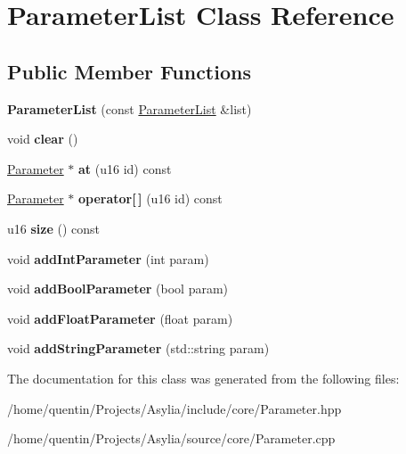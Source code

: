 \hypertarget{classParameterList}{\section{Parameter\-List Class Reference}
\label{classParameterList}
}
\subsection*{Public Member Functions}
\begin{DoxyCompactItemize}
\item 
\hypertarget{classParameterList_acaad445445e1d62203322e3f5c049172}{{\bfseries Parameter\-List} (const \hyperlink{classParameterList}{Parameter\-List} \&list)}\label{classParameterList_acaad445445e1d62203322e3f5c049172}

\item 
\hypertarget{classParameterList_a6f2125f1182f2615d5b4e4ce5351651f}{void {\bfseries clear} ()}\label{classParameterList_a6f2125f1182f2615d5b4e4ce5351651f}

\item 
\hypertarget{classParameterList_a5337ced79cbaf86cda826f99f3c622fa}{\hyperlink{classParameter}{Parameter} $\ast$ {\bfseries at} (u16 id) const }\label{classParameterList_a5337ced79cbaf86cda826f99f3c622fa}

\item 
\hypertarget{classParameterList_af413109556e5e36b89bbd9e63e64fb54}{\hyperlink{classParameter}{Parameter} $\ast$ {\bfseries operator\mbox{[}$\,$\mbox{]}} (u16 id) const }\label{classParameterList_af413109556e5e36b89bbd9e63e64fb54}

\item 
\hypertarget{classParameterList_a398b37da9adf25660d5646cb52fb94e1}{u16 {\bfseries size} () const }\label{classParameterList_a398b37da9adf25660d5646cb52fb94e1}

\item 
\hypertarget{classParameterList_a63f35d0e0e11936de0e13ef3246b1fef}{void {\bfseries add\-Int\-Parameter} (int param)}\label{classParameterList_a63f35d0e0e11936de0e13ef3246b1fef}

\item 
\hypertarget{classParameterList_a2ccd2e18b60b3f2789779031d62e41b3}{void {\bfseries add\-Bool\-Parameter} (bool param)}\label{classParameterList_a2ccd2e18b60b3f2789779031d62e41b3}

\item 
\hypertarget{classParameterList_a3be261ee73ebea19edb18bd233994af1}{void {\bfseries add\-Float\-Parameter} (float param)}\label{classParameterList_a3be261ee73ebea19edb18bd233994af1}

\item 
\hypertarget{classParameterList_ab7f3c8ec0b1d4ee4e614c3fdd588a245}{void {\bfseries add\-String\-Parameter} (std\-::string param)}\label{classParameterList_ab7f3c8ec0b1d4ee4e614c3fdd588a245}

\end{DoxyCompactItemize}


The documentation for this class was generated from the following files\-:\begin{DoxyCompactItemize}
\item 
/home/quentin/\-Projects/\-Asylia/include/core/Parameter.\-hpp\item 
/home/quentin/\-Projects/\-Asylia/source/core/Parameter.\-cpp\end{DoxyCompactItemize}
